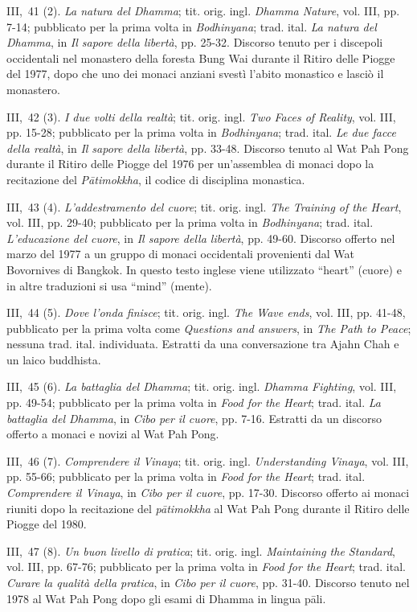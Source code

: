 III,~41 (2). \emph{La natura del Dhamma}; tit. orig. ingl. \emph{Dhamma
Nature}, vol. III, pp. 7-14; pubblicato per la prima volta in
\emph{Bodhinyana}; trad. ital. \emph{La natura del Dhamma}, in \emph{Il
sapore della libertà}, pp. 25-32. Discorso tenuto per i discepoli
occidentali nel monastero della foresta Bung Wai durante il Ritiro delle
Piogge del 1977, dopo che uno dei monaci anziani svestì l'abito
monastico e lasciò il monastero.

III,~42 (3). \emph{I due volti della realtà}; tit. orig. ingl. \emph{Two
Faces of Reality}, vol. III, pp. 15-28; pubblicato per la prima volta in
\emph{Bodhinyana}; trad. ital. \emph{Le due facce della realtà}, in
\emph{Il sapore della libertà}, pp. 33-48. Discorso tenuto al Wat Pah
Pong durante il Ritiro delle Piogge del 1976 per un'assemblea di monaci
dopo la recitazione del \emph{Pātimokkha}, il codice di disciplina
monastica.

III,~43 (4). \emph{L'addestramento del cuore}; tit. orig. ingl.
\emph{The Training of the Heart}, vol. III, pp. 29-40; pubblicato per la
prima volta in \emph{Bodhinyana}; trad. ital. \emph{L'educazione del
cuore}, in \emph{Il sapore della libertà}, pp. 49-60. Discorso offerto
nel marzo del 1977 a un gruppo di monaci occidentali provenienti dal Wat
Bovornives di Bangkok. In questo testo inglese viene utilizzato
``heart'' (cuore) e in altre traduzioni si usa ``mind'' (mente).

III,~44 (5). \emph{Dove l'onda finisce}; tit. orig. ingl. \emph{The Wave
ends}, vol. III, pp. 41-48, pubblicato per la prima volta come
\emph{Questions and answers}, in \emph{The Path to Peace}; nessuna trad.
ital. individuata. Estratti da una conversazione tra Ajahn Chah e un
laico buddhista.

III,~45 (6). \emph{La battaglia del Dhamma}; tit. orig. ingl.
\emph{Dhamma Fighting}, vol. III, pp. 49-54; pubblicato per la prima
volta in \emph{Food for the Heart}; trad. ital. \emph{La battaglia del
Dhamma}, in \emph{Cibo per il cuore}, pp. 7-16. Estratti da un discorso
offerto a monaci e novizi al Wat Pah Pong.

III,~46 (7). \emph{Comprendere il Vinaya}; tit. orig. ingl.
\emph{Understanding Vinaya}, vol. III, pp. 55-66; pubblicato per la
prima volta in \emph{Food for the Heart}; trad. ital. \emph{Comprendere
il Vinaya}, in \emph{Cibo per il cuore}, pp. 17-30. Discorso offerto ai
monaci riuniti dopo la recitazione del \emph{pātimokkha} al Wat Pah Pong
durante il Ritiro delle Piogge del 1980.

III,~47 (8). \emph{Un buon livello di pratica}; tit. orig. ingl.
\emph{Maintaining the Standard}, vol. III, pp. 67-76; pubblicato per la
prima volta in \emph{Food for the Heart}; trad. ital. \emph{Curare la
qualità della pratica}, in \emph{Cibo per il cuore}, pp. 31-40. Discorso
tenuto nel 1978 al Wat Pah Pong dopo gli esami di Dhamma in lingua pāli.

